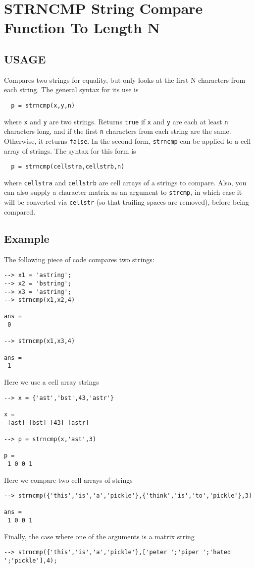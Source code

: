 \section{STRNCMP String Compare Function To Length N}

\subsection{USAGE}

Compares two strings for equality, but only looks at the
first N characters from each string.  The general syntax 
for its use is
\begin{verbatim}
  p = strncmp(x,y,n)
\end{verbatim}
where \verb|x| and \verb|y| are two strings.  Returns \verb|true| if \verb|x|
and \verb|y| are each at least \verb|n| characters long, and if the
first \verb|n| characters from each string are the same.  Otherwise,
it returns \verb|false|.
In the second form, \verb|strncmp| can be applied to a cell array of
strings.  The syntax for this form is
\begin{verbatim}
  p = strncmp(cellstra,cellstrb,n)
\end{verbatim}
where \verb|cellstra| and \verb|cellstrb| are cell arrays of a strings
to compare.  Also, you can also supply a character matrix as
an argument to \verb|strcmp|, in which case it will be converted
via \verb|cellstr| (so that trailing spaces are removed), before being
compared.
\subsection{Example}

The following piece of code compares two strings:
\begin{verbatim}
--> x1 = 'astring';
--> x2 = 'bstring';
--> x3 = 'astring';
--> strncmp(x1,x2,4)

ans = 
 0 

--> strncmp(x1,x3,4)

ans = 
 1 
\end{verbatim}
Here we use a cell array strings
\begin{verbatim}
--> x = {'ast','bst',43,'astr'}

x = 
 [ast] [bst] [43] [astr] 

--> p = strncmp(x,'ast',3)

p = 
 1 0 0 1 
\end{verbatim}
Here we compare two cell arrays of strings
\begin{verbatim}
--> strncmp({'this','is','a','pickle'},{'think','is','to','pickle'},3)

ans = 
 1 0 0 1 
\end{verbatim}
Finally, the case where one of the arguments is a matrix
string
\begin{verbatim}
--> strncmp({'this','is','a','pickle'},['peter ';'piper ';'hated ';'pickle'],4);
\end{verbatim}
